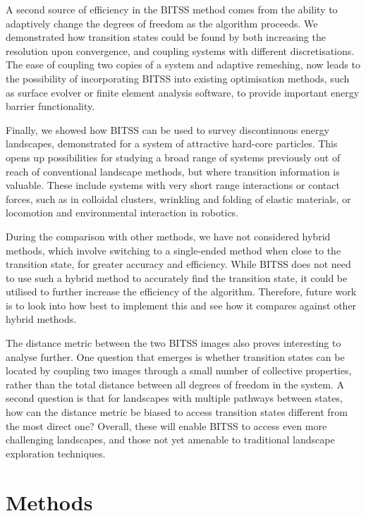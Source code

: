 \documentclass[twocolumn,10pt]{revtex4}
\begin{document}
A second source of efficiency in the BITSS method comes from the ability to adaptively change the degrees of freedom as the algorithm proceeds.
We demonstrated how transition states could be found by both increasing the resolution upon convergence, and coupling systems with different discretisations.
The ease of coupling two copies of a system and adaptive remeshing, now leads to the possibility of incorporating BITSS into existing optimisation methods, such as surface evolver \cite{Brakke1992} or finite element analysis software, to provide important energy barrier functionality. 

Finally, we showed how BITSS can be used to survey discontinuous energy landscapes, demonstrated for a system of attractive hard-core particles.
This opens up possibilities for studying a broad range of systems previously out of reach of conventional landscape methods, but where transition information is valuable.
These include systems with very short range interactions or contact forces, such as in colloidal clusters, wrinkling and folding of elastic materials, or locomotion and environmental interaction in robotics.

During the comparison with other methods, we have not considered hybrid methods, which involve switching to a single-ended method when close to the transition state, for greater accuracy and efficiency.
While BITSS does not need to use such a hybrid method to accurately find the transition state, it could be utilised to further increase the efficiency of the algorithm.
Therefore, future work is to look into how best to implement this and see how it compares against other hybrid methods.

The distance metric between the two BITSS images also proves interesting to analyse further.
One question that emerges is whether transition states can be located by coupling two images through a small number of collective properties, rather than the total distance between all degrees of freedom in the system.
A second question is that for landscapes with multiple pathways between states, how can the distance metric be biased to access transition states different from the most direct one?
Overall, these will enable BITSS to access even more challenging landscapes, and those not yet amenable to traditional landscape exploration techniques.


\section{Methods}
\end{document}
